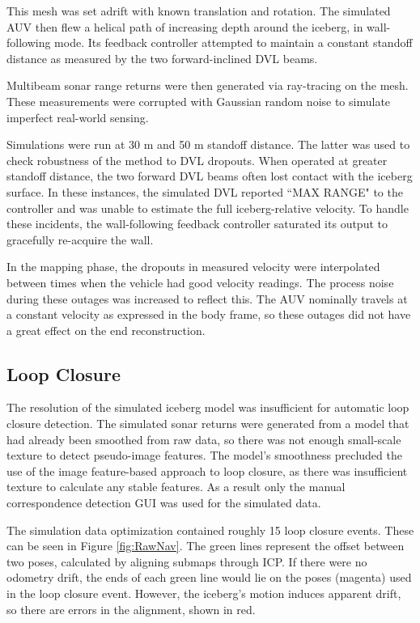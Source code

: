 This mesh was set adrift with known translation and rotation. The simulated AUV then flew a helical path of increasing depth around the iceberg, in wall-following mode. Its feedback controller attempted to maintain a constant standoff distance as measured by the two forward-inclined DVL beams.

Multibeam sonar range returns were then generated via ray-tracing on the mesh. These measurements were corrupted with Gaussian random noise to simulate imperfect real-world sensing. 

Simulations were run at 30 m and 50 m standoff distance. The latter was used to check robustness of the method to DVL dropouts. When operated at greater standoff distance, the two forward DVL beams often lost contact with the iceberg surface. In these instances, the simulated DVL reported ``MAX RANGE" to the controller and was unable to estimate the full iceberg-relative velocity. To handle these incidents, the wall-following feedback controller saturated its output to gracefully re-acquire the wall. 

In the mapping phase, the dropouts in measured velocity were interpolated between times when the vehicle had good velocity readings. The process noise during these outages was increased to reflect this. The AUV nominally travels at a constant velocity as expressed in the body frame, so these outages did not have a great effect on the end reconstruction.

\subsection{Loop Closure}

The resolution of the simulated iceberg model was insufficient for automatic loop closure detection. The simulated sonar returns were generated from a model that had already been smoothed from raw data, so there was not enough small-scale texture to detect pseudo-image features. The model's smoothness precluded the use of the image feature-based approach to loop closure, as there was insufficient texture to calculate any stable features. As a result only the manual correspondence detection GUI was used for the simulated data. 

The simulation data optimization contained roughly 15 loop closure events. These can be seen in Figure \ref{fig:RawNav}. The green lines represent the offset between two poses, calculated by aligning submaps through ICP. If there were no odometry drift, the ends of each green line would lie on the poses (magenta) used in the loop closure event. However, the iceberg's motion induces apparent drift, so there are errors in the alignment, shown in red.

